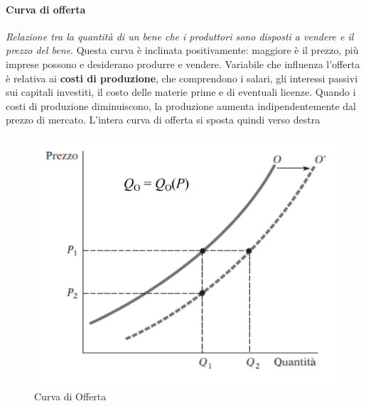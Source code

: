 \documentclass[12pt]{article}
\begin{document}
\paragraph{Curva di offerta} \textit{Relazione tra la quantità di un bene che i produttori sono disposti a vendere e il prezzo del bene}. Questa curva è inclinata positivamente: maggiore è il prezzo, più imprese possono e desiderano produrre e vendere. Variabile che influenza l'offerta è relativa ai \textbf{costi di produzione}, che comprendono i salari, gli interessi passivi sui capitali investiti, il costo delle materie prime e di eventuali licenze. Quando i costi di produzione diminuiscono, la produzione aumenta indipendentemente dal prezzo di mercato. L’intera curva di offerta si sposta quindi verso destra
\FloatBarrier
\begin{figure}[!htb]
    \centering
    \includegraphics[width=1\textwidth]{images/offerta.png}
    \caption{Curva di Offerta}
\end{figure}
\end{document}
